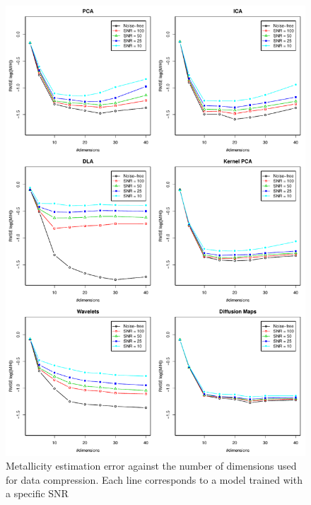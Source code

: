 \documentclass[a4paper,fleqn,usenatbib]{mnras}
\begin{document}
{{{\begin{figure}
\centering\includegraphics[height=0.95\textheight]{flamesHR10_Meta_log_BestSVM_N-SNR-RMSE_test.pdf}
\caption{Metallicity estimation error against the number of dimensions
  used for data compression. Each line corresponds to a model trained
  with a specific SNR}
\label{fig:methodsnrMeta}
\end{figure}

}}}
\end{document}
